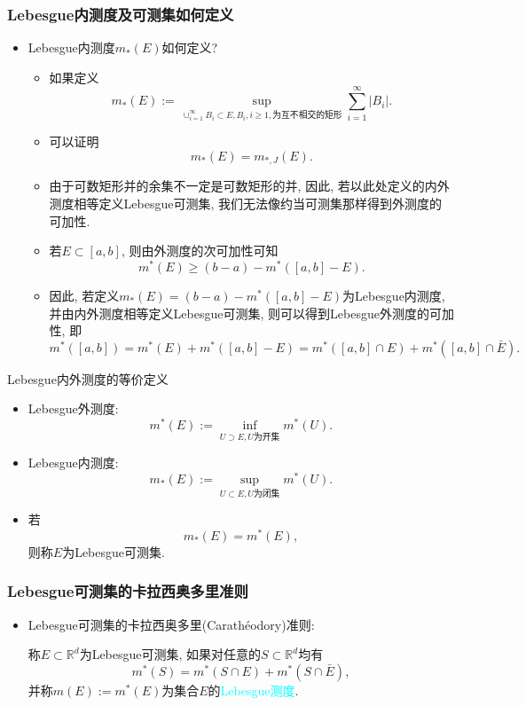 \documentclass[Prob-All.tex]{subfiles}
\begin{document}
\begin{frame}
	\frametitle{{\rm Lebesgue}内测度及可测集如何定义}

	\begin{itemize}[<+-|alert@+>]
		\item {\rm Lebesgue}内测度$m_*(E)$如何定义?
		\begin{itemize}[<+-|alert@+>]
		\item 如果定义
		$$m_*(E):=\sup_{\cup_{i=1}^\infty B_i\subset E, B_i, i\geq 1, \mbox{为互不相交的矩形}}\sum_{i=1}^\infty |B_i|.$$
		\item 可以证明
		$$m_*(E)=m_{*,J}(E).$$
		\item 由于可数矩形并的余集不一定是可数矩形的并, 因此, 若以此处定义的内外测度相等定义{\rm Lebesgue}可测集, 我们无法像约当可测集那样得到外测度的可加性.
		\item 若$E\subset [a,b]$, 则由外测度的次可加性可知
		$$m^*(E)\geq (b-a)-m^*([a,b]-E).$$
		\item 因此, 若定义$m_*(E)=(b-a)-m^*([a,b]-E)$为{\rm Lebesgue}内测度,并由内外测度相等定义{\rm Lebesgue}可测集, 则可以得到{\rm Lebesgue}外测度的可加性, 即
		$$m^*([a,b])=m^*(E)+m^*([a,b]-E)=m^*([a,b]\cap E)+m^*([a,b]\cap \bar{E}).$$
		\end{itemize}

	\end{itemize}
\end{frame}

\begin{frame}{{\rm Lebesgue}内外测度的等价定义}

	\begin{itemize}[<+-|alert@+>]
		\item {\rm Lebesgue}外测度:
		$$m^*(E):=\inf_{U\supset E, U\mbox{为开集}}m^*(U).$$
		\item {\rm Lebesgue}内测度:
		$$m_*(E):=\sup_{U\subset E, U\mbox{为闭集}}m^*(U).$$
		\item 若
		$$m_*(E)=m^*(E),$$
		则称$E$为{\rm Lebesgue}可测集.
	\end{itemize}

\end{frame}

\begin{frame}
	\frametitle{{\rm Lebesgue}可测集的卡拉西奥多里准则}

	\begin{itemize}[<+-|alert@+>]

		\item{\rm Lebesgue}可测集的卡拉西奥多里({\rm Carath{\'e}odory})准则:\pause
		\vspace{0.4cm}

		称$E\subset\mathbb{R}^d$为{\rm Lebesgue}可测集, 如果对任意的$S\subset\mathbb{R}^d$均有
		\[m^*(S)=m^*(S\cap E)+m^*(S\cap \bar{E}),\]
		并称$m(E):=m^*(E)$为集合$E$的\textcolor{cyan}{{\rm Lebesgue}测度}.
	\end{itemize}
\end{frame}
\end{document}
